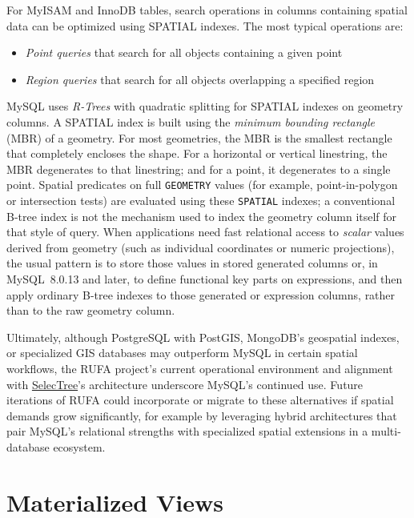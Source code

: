 For MyISAM and InnoDB tables, search operations in columns containing spatial data can be optimized using SPATIAL indexes. The most typical operations are:

\begin{itemize}
    \item \textit{Point queries} that search for all objects containing a given point
    \item \textit{Region queries} that search for all objects overlapping a specified region
\end{itemize}

MySQL uses \textit{R-Trees} with quadratic splitting for SPATIAL indexes on geometry columns. A SPATIAL index is built using the \textit{minimum bounding rectangle} (MBR) of a geometry. For most geometries, the MBR is the smallest rectangle that completely encloses the shape. For a horizontal or vertical linestring, the MBR degenerates to that linestring; and for a point, it degenerates to a single point. Spatial predicates on full \texttt{GEOMETRY} values (for example, point-in-polygon or intersection tests) are evaluated using these \texttt{SPATIAL} indexes; a conventional B-tree index is not the mechanism used to index the geometry column itself for that style of query. When applications need fast relational access to \emph{scalar} values derived from geometry (such as individual coordinates or numeric projections), the usual pattern is to store those values in stored generated columns or, in MySQL~8.0.13 and later, to define functional key parts on expressions, and then apply ordinary B-tree indexes to those generated or expression columns, rather than to the raw geometry column.

Ultimately, although PostgreSQL with PostGIS, MongoDB's geospatial indexes, or specialized GIS databases may outperform MySQL in certain spatial workflows, the RUFA project's current operational environment and alignment with \href{https://selectree.calpoly.edu}{SelecTree}'s architecture underscore MySQL's continued use. Future iterations of RUFA could incorporate or migrate to these alternatives if spatial demands grow significantly, for example by leveraging hybrid architectures that pair MySQL’s relational strengths with specialized spatial extensions in a multi-database ecosystem.

\section{Materialized Views}

